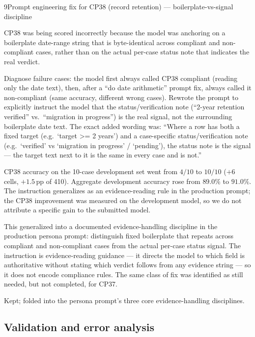 \begin{explog}{9}{Prompt engineering fix for CP38 (record retention) --- boilerplate-vs-signal discipline}
\item[Hypothesis] CP38 was being scored incorrectly because the model was anchoring on a boilerplate date-range string that is byte-identical across compliant and non-compliant cases, rather than on the actual per-case status note that indicates the real verdict.
\item[Method] Diagnose failure cases: the model first always called CP38 compliant (reading only the date text), then, after a ``do date arithmetic'' prompt fix, always called it non-compliant (same accuracy, different wrong cases). Rewrote the prompt to explicitly instruct the model that the status/verification note (``2-year retention verified'' vs.\ ``migration in progress'') is the real signal, not the surrounding boilerplate date text. The exact added wording was: ``Where a row has both a fixed target (e.g.\ `target >= 2 years') and a case-specific status/verification note (e.g.\ `verified' vs `migration in progress' / `pending'), the status note is the signal --- the target text next to it is the same in every case and is not.''
\item[Result] CP38 accuracy on the 10-case development set went from $4/10$ to $10/10$ ($+6$ cells, $+1.5$\,pp of 410). Aggregate development accuracy rose from $89.0\%$ to $91.0\%$. The instruction generalizes as an evidence-reading rule in the production prompt; the CP38 improvement was measured on the development model, so we do not attribute a specific gain to the submitted model.
\item[Inference] This generalized into a documented evidence-handling discipline in the production persona prompt: distinguish fixed boilerplate that repeats across compliant and non-compliant cases from the actual per-case status signal. The instruction is evidence-reading guidance --- it directs the model to which field is authoritative without stating which verdict follows from any evidence string --- so it does not encode compliance rules. The same class of fix was identified as still needed, but not completed, for CP37.
\item[Verdict] Kept; folded into the persona prompt's three core evidence-handling disciplines.
\end{explog}


\subsection{Validation and error analysis}

